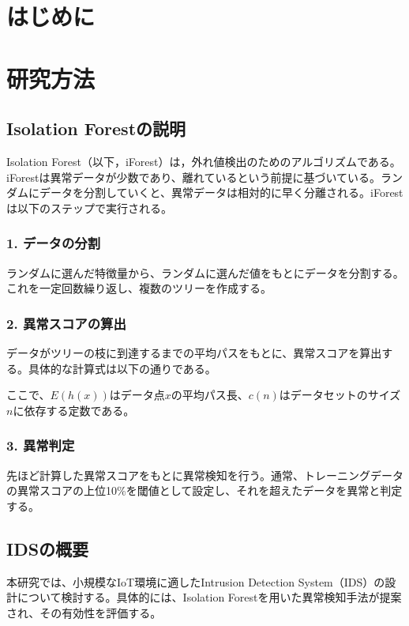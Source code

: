 \documentclass{css}
\begin{document}
\maketitle

\section{はじめに}

\section{研究方法}

\subsection{Isolation Forestの説明}
Isolation Forest（以下，iForest）は，外れ値検出のためのアルゴリズムである。iForestは異常データが少数であり、離れているという前提に基づいている。ランダムにデータを分割していくと、異常データは相対的に早く分離される。iForestは以下のステップで実行される。

\subsubsection*{1. データの分割}
ランダムに選んだ特徴量から、ランダムに選んだ値をもとにデータを分割する。これを一定回数繰り返し、複数のツリーを作成する。

\subsubsection*{2. 異常スコアの算出}
データがツリーの枝に到達するまでの平均パスをもとに、異常スコアを算出する。具体的な計算式は以下の通りである。

ここで、$E(h(x))$はデータ点$x$の平均パス長、$c(n)$はデータセットのサイズ$n$に依存する定数である。

\subsubsection*{3. 異常判定}
先ほど計算した異常スコアをもとに異常検知を行う。通常、トレーニングデータの異常スコアの上位10\%を閾値として設定し、それを超えたデータを異常と判定する。


\subsection{IDSの概要}
本研究では、小規模なIoT環境に適したIntrusion Detection System（IDS）の設計について検討する。具体的には、Isolation Forestを用いた異常検知手法が提案され、その有効性を評価する。
\end{document}
